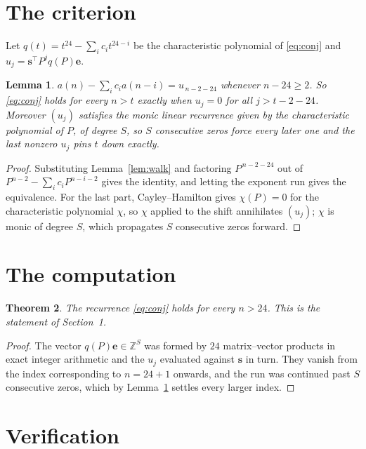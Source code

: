 \documentclass[11pt,a4paper]{article}
\theoremstyle{plain}
\newtheorem{theorem}{Theorem}
\newtheorem{lemma}[theorem]{Lemma}
\theoremstyle{definition}
\begin{document}
\section{The criterion}

Let $q(t)=t^{24}-\sum_i c_i t^{24-i}$ be the characteristic polynomial of
\eqref{eq:conj} and $u_j=\mathbf{s}^{\!\top}P^{j}q(P)\mathbf{e}$.

\begin{lemma}\label{lem:crit}
$a(n)-\sum_i c_i a(n-i)=u_{\,n-2-24}$ whenever $n-24\ge2$. So \eqref{eq:conj}
holds for every $n>t$ exactly when $u_j=0$ for all $j>t-2-24$. Moreover $(u_j)$
satisfies the monic linear recurrence given by the characteristic polynomial of $P$, of
degree $S$, so $S$ consecutive zeros force every later one and the last nonzero $u_j$ pins
$t$ down exactly.
\end{lemma}

\begin{proof}
Substituting Lemma~\ref{lem:walk} and factoring $P^{\,n-2-24}$ out of
$P^{n-2}-\sum_i c_i P^{n-i-2}$ gives the identity, and letting the exponent run gives the
equivalence. For the last part, Cayley--Hamilton gives $\chi(P)=0$ for the characteristic
polynomial $\chi$, so $\chi$ applied to the shift annihilates $(u_j)$; $\chi$ is monic of
degree $S$, which propagates $S$ consecutive zeros forward.
\end{proof}

\section{The computation}

\begin{theorem}
The recurrence \eqref{eq:conj} holds for every $n>24$. This is the statement of
Section~1.
\end{theorem}

\begin{proof}
The vector $q(P)\mathbf{e}\in\mathbb{Z}^{S}$ was formed by $24$ matrix--vector
products in exact integer arithmetic and the $u_j$ evaluated against $\mathbf{s}$ in turn.
They vanish from the index corresponding to $n=24+1$ onwards, and the run was continued
past $S$ consecutive zeros, which by Lemma~\ref{lem:crit} settles every larger index.
\end{proof}

\section{Verification}
\end{document}
